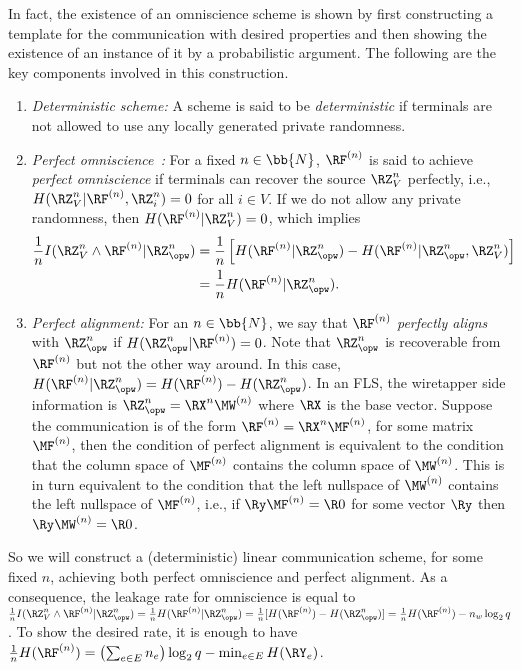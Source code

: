 In fact, the existence of an omniscience scheme is shown by first constructing a template for the communication with desired properties and then showing the existence of an instance of it by a probabilistic argument. The  following are the key components involved in this construction.
\begin{enumerate}
\item \emph{Deterministic scheme:} A scheme is said to be \emph{deterministic} if  terminals are  not allowed to use any locally generated private randomness. 
 \item \emph{Perfect omniscience~\cite{sirinperfect}:} For a fixed $n \in \bb{N}$, $\RF^{(n)}$ is said to achieve \emph{perfect omniscience} if  terminals can recover the source $\RZ_V^n$ perfectly, i.e., $H(\RZ_V^n|\RF^{(n)}, \RZ_i^n) =0$ for all $i \in V$. If we do not allow any private randomness, then $H( \RF^{(n)} |  \RZ_V^n) = 0$, which implies
  \begin{align*}\label{eq:perfectomni}
  \begin{split}
   \frac{1}{n}  I(\RZ_V^n\wedge \RF^{(n)} | \RZ_{\opw}^n) &= \frac{1}{n}\left [H( \RF^{(n)} | \RZ_{\opw}^n) - H( \RF^{(n)} | \RZ_{\opw}^n, \RZ_V^n) \right] \\&= \frac{1}{n}H( \RF^{(n)} | \RZ_{\opw}^n).
  \end{split}
\end{align*} 
\item \emph{Perfect alignment:} For an $n \in \bb{N}$, we say that $\RF^{(n)}$ \emph{perfectly aligns} with $\RZ_{\opw}^n$ if $H( \RZ_{\opw}^n|\RF^{(n)} ) = 0$. Note that $\RZ_{\opw}^n$ is  recoverable from $\RF^{(n)}$ but not the other way around. In this case, $H( \RF^{(n)} | \RZ_{\opw}^n) =H( \RF^{(n)}) - H( \RZ_{\opw}^n)$. In an FLS, the wiretapper side information is $\RZ_{\opw}^n = \RX^n \MW^{(n)}$ where $\RX$ is the base vector. Suppose the communication is of the form $\RF^{(n)} = \RX^n \MF^{(n)}$, for some matrix $\MF^{(n)}$, then the condition of  perfect alignment is equivalent to the condition that the column space of $\MF^{(n)}$ contains the column space of $\MW^{(n)}$. This is in turn equivalent to the condition that the left nullspace of $\MW^{(n)}$ contains the left nullspace of $\MF^{(n)}$, i.e., if $\Ry \MF^{(n)}=\R0$ for some vector $\Ry$ then $\Ry \MW^{(n)}=\R0$.
\end{enumerate}
So we will construct a (deterministic) linear communication scheme, for some fixed $n$, achieving both perfect omniscience and perfect alignment. As a consequence,  the leakage rate for omniscience is equal to $\frac{1}{n}  I(\RZ_V^n\wedge \RF^{(n)} | \RZ_{\opw}^n) = \frac{1}{n}H( \RF^{(n)} | \RZ_{\opw}^n) = \frac{1}{n}[H( \RF^{(n)}) - H( \RZ_{\opw}^n)] = \frac{1}{n}H( \RF^{(n)}) - n_w\log_2q$. To show the desired rate, it is enough to have $\frac{1}{n}H( \RF^{(n)}) = \left(\sum_{e \in E}n_e\right) \log_2q  - \min_{e \in E} H(\RY_e) $.

